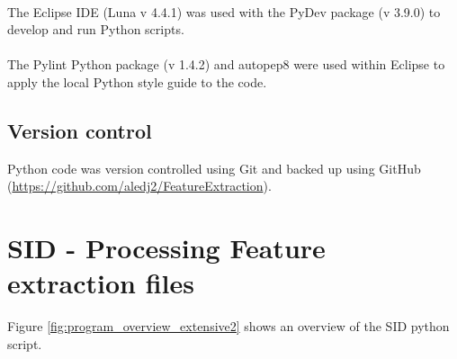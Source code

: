 \paragraph*{}
The Eclipse IDE (Luna v 4.4.1) \cite{the_eclipse_foundation_eclipse_????} was used with the PyDev package (v 3.9.0) \cite{pydev_python_????} to develop and run Python scripts.
\paragraph*{}
The Pylint Python package (v 1.4.2) \cite{pylint_code_????} and autopep8 were used within Eclipse to apply the local Python style guide to the code.

\subsection{Version control}
Python code was version controlled using Git and backed up using GitHub (\url{https://github.com/aledj2/FeatureExtraction}).


\section{SID - Processing Feature extraction files}
Figure \ref{fig:program_overview_extensive2} shows an overview of the SID python script.

